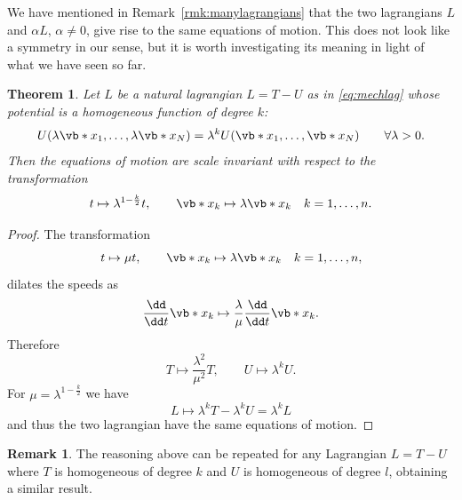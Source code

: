 \documentclass[english,fontsize=11pt,paper=b5]{scrbook}
\newtheorem{theorem}{Theorem}[chapter]
\theoremstyle{definition}
\newtheorem{remark}{Remark}[chapter]
\begin{document}
    We have mentioned in Remark~\ref{rmk:manylagrangians} that the two lagrangians $L$ and $\alpha L$, $\alpha\neq0$, give rise to the same equations of motion.
    This does not look like a symmetry in our sense, but it is worth investigating its meaning in light of what we have seen so far.

    \begin{theorem}
      Let $L$ be a natural lagrangian $L=T-U$ as in \eqref{eq:mechlag} whose potential is a homogeneous function of degree $k$:
      \begin{equation}
        U(\lambda\vb*{x}_1, \ldots, \lambda\vb*{x}_N) = \lambda^k U(\vb*{x}_1, \ldots, \vb*{x}_N)
        \qquad\forall \lambda>0.
      \end{equation}
      Then the equations of motion are scale invariant with respect to the transformation
      \begin{equation}
        t \mapsto \lambda^{1-\frac{k}2} t, \qquad
        \vb*{x}_k \mapsto \lambda\vb*{x}_k \quad k=1,\ldots,n.
      \end{equation}
    \end{theorem}
    \begin{proof}
      The transformation
      \begin{equation}
        t \mapsto \mu t, \qquad
        \vb*{x}_k \mapsto \lambda\vb*{x}_k \quad k=1,\ldots,n,
      \end{equation}
      dilates the speeds as
      \begin{equation}
        \frac{\dd}{\dd t} \vb*{x}_k \mapsto \frac{\lambda}{\mu} \frac{\dd}{\dd t}\vb*{x}_k.
      \end{equation}
      Therefore
      \begin{equation}
        T \mapsto \frac{\lambda^2}{\mu^2} T, \qquad U \mapsto \lambda^k U.
      \end{equation}
      For $\mu = \lambda^{1-\frac{k}2}$ we have
      \begin{equation}
        L \mapsto \lambda^k T - \lambda^k U = \lambda^k L
      \end{equation}
      and thus the two lagrangian have the same equations of motion.
    \end{proof}

    \begin{remark}
      The reasoning above can be repeated for any Lagrangian $L = T - U$ where $T$ is homogeneous of degree $k$ and $U$ is homogeneous of degree $l$, obtaining a similar result.
    \end{remark}
\end{document}
